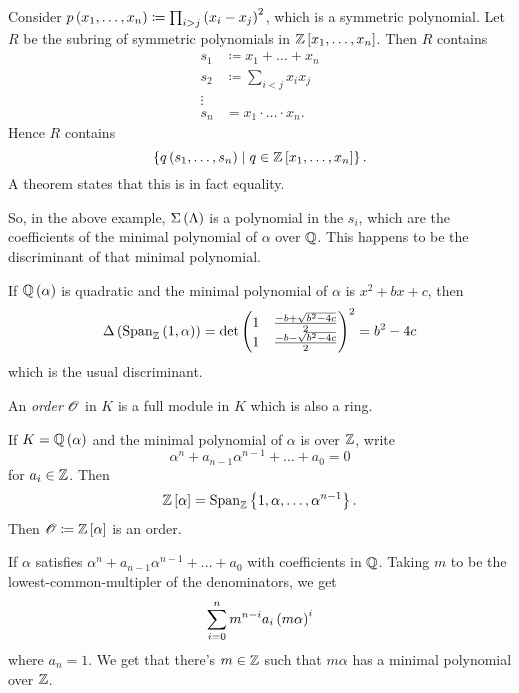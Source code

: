 \documentclass[11pt]{article}
\begin{document}
\begin{remark}
Consider $p\left( x_1, \ldots, x_n \right) \coloneqq \prod_{i > j} \left( x_i - x_j \right)^2$, which is a symmetric polynomial.
Let $R$ be the subring of symmetric polynomials in $\mathbb{Z}\left[ x_1, \ldots, x_n \right]$. Then $R$ contains
\begin{align*}
s_1 &\coloneqq x_1 + \ldots + x_n \\
s_2 &\coloneqq \sum_{i < j} x_i x_j \\
\vdots \\
s_n &= x_1 \cdot \ldots \cdot x_n \text{.}
\end{align*}
Hence $R$ contains
\[\set{q\prs{s_1, \ldots, s_n}}{q \in \mbb{Z}\brs{x_1, \ldots, x_n}} \text{.}\]
A theorem states that this is in fact equality. 

So, in the above example, $\Sigma\left( \Lambda \right)$ is a polynomial in the $s_i$, which are the coefficients of the minimal polynomial of $\alpha$ over $\mathbb{Q}$. This happens to be the discriminant of that minimal polynomial.
\end{remark}

\begin{example}
If $\mathbb{Q}\left( \alpha \right)$ is quadratic and the minimal polynomial of $\alpha$ is $x^2 + bx + c$, then
\begin{align*}
\Delta\left( \operatorname{Span}_{\mathbb{Z}}\left( 1, \alpha \right) \right) = \det\begin{pmatrix}1 & \frac{-b + \sqrt{b^2 - 4c}}{2} \\ 1 & \frac{-b - \sqrt{b^2 - 4c}}{2}\end{pmatrix}^2 = b^2 - 4c
\end{align*}
which is the usual discriminant.
\end{example}

\begin{definition}[Order]
An \emph{order} $\mathcal{O}$ in $K$ is a full module in $K$ which is also a ring.
\end{definition}

\begin{example}
If $K = \mathbb{Q}\left( \alpha \right)$ and the minimal polynomial of $\alpha$ is over $\mathbb{Z}$, write
\[\alpha^n + a_{n-1} \alpha^{n-1} + \ldots + a_0 = 0\]
for $a_i \in \mathbb{Z}$. Then
\[\mbb{Z}\brs{\alpha} = \Span_{\mbb{Z}}\set{1, \alpha, \ldots, \alpha^{n-1}} \text{.}\]
Then $\mathcal{O} \coloneqq \mathbb{Z}\left[ \alpha \right]$ is an order.
\end{example}

\begin{remark}
If $\alpha$ satisfies $\alpha^n + a_{n-1} \alpha^{n-1} + \ldots + a_0$ with coefficients in $\mathbb{Q}$.
Taking $m$ to be the lowest-common-multipler of the denominators, we get
\[\sum_{i = 0}^n m^{n-i} a_i \left( m \alpha \right)^i\]
where $a_n = 1$.
We get that there's $m \in \mathbb{Z}$ such that $m \alpha$ has a minimal polynomial over $\mathbb{Z}$. 
\end{remark}
\end{document}
